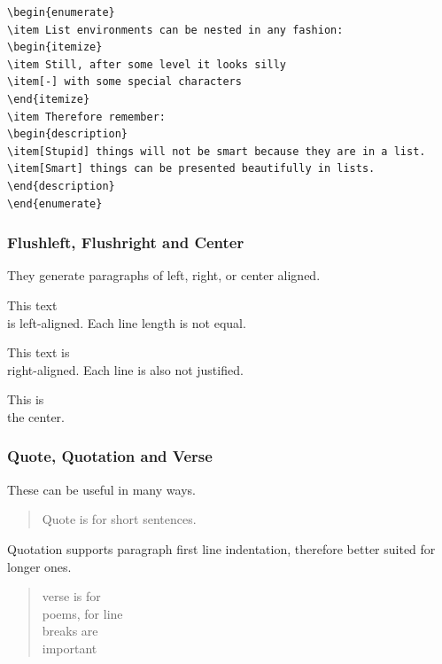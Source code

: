 \documentclass[10pt, a4paper]{article}
\begin{document}
\begin{verbatim}
\begin{enumerate}
\item List environments can be nested in any fashion:
\begin{itemize}
\item Still, after some level it looks silly
\item[-] with some special characters
\end{itemize}
\item Therefore remember:
\begin{description}
\item[Stupid] things will not be smart because they are in a list.
\item[Smart] things can be presented beautifully in lists.
\end{description}
\end{enumerate}
\end{verbatim}

\subsubsection{Flushleft, Flushright and Center}
They generate paragraphs of left, right, or center aligned.
\begin{flushleft}
This text\\ is left-aligned. Each line length is not equal. 
\end{flushleft}
\begin{flushright}
This text is \\ right-aligned. Each line is also not justified.
\end{flushright}
\begin{center}
This is\\ the center.
\end{center}

\subsubsection{Quote, Quotation and Verse}
These can be useful in many ways.
\begin{quote}
Quote is for short sentences.
\end{quote}
Quotation supports paragraph first line indentation, therefore better suited for longer ones.
\begin{flushright}
\begin{verse}
verse is for\\ poems, for line\\ breaks are \\ important
\end{verse}
\end{flushright}
\end{document}
